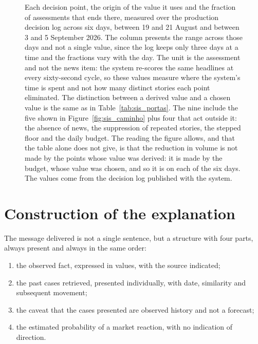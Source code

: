 \begin{figure}[!htbp]
\caption[The nine decision points, the origin of their value and what each one eliminates]{Each
decision point, the origin of the value it uses and the fraction of assessments that ends there,
measured over the production decision log across six days, between 19 and 21 August and between 3
and 5 September 2026. The column presents the range across those days and not a single value, since
the log keeps only three days at a time and the fractions vary with the day. The unit is the
assessment and not the news item: the system re-scores the same headlines at every sixty-second
cycle, so these values measure where the system's time is spent and not how many distinct stories
each point eliminated. The distinction between a derived value and a chosen value is the same as in
Table~\ref{tab:sis_portas}. The nine include the five shown in
Figure~\ref{fig:sis_caminho} plus four that act outside it: the absence of news, the
suppression of repeated stories, the stepped floor and the daily budget. The reading the
figure allows, and that the table alone does not give, is that the reduction in volume is not
made by the points whose value was derived: it is made by
the budget, whose value was chosen, and so it is on each of the six days. The values come from the
decision log published with the system.}
\label{fig:sis_razoes}
\end{figure}


\section{Construction of the explanation}
\label{sec:sis_explicacao}

The message delivered is not a single sentence, but a structure with four parts, always present
and always in the same order:

\begin{enumerate}
  \item the observed fact, expressed in values, with the source indicated;
  \item the past cases retrieved, presented individually, with date, similarity and subsequent
        movement;
  \item the caveat that the cases presented are observed history and not a forecast;
  \item the estimated probability of a market reaction, with no indication of direction.
\end{enumerate}

